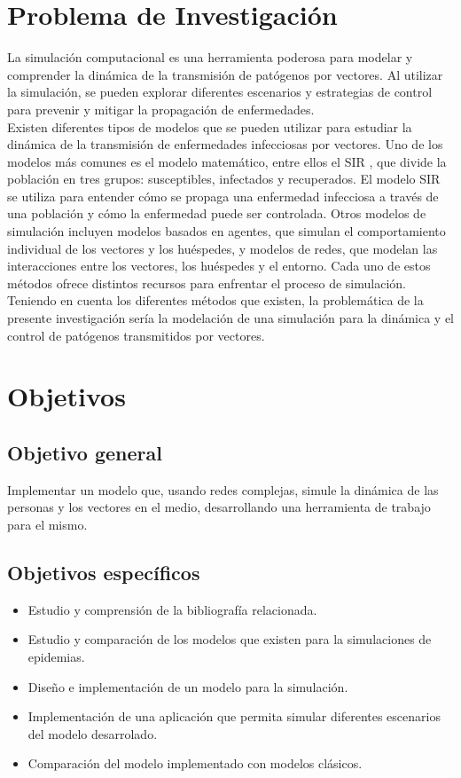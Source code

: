 \section{Problema de Investigación}
La simulación computacional es una herramienta poderosa para modelar y comprender
la dinámica de la transmisión de patógenos por vectores. Al utilizar la simulación,
se pueden explorar diferentes escenarios y estrategias de control para prevenir y mitigar 
la propagación de enfermedades.\\
Existen diferentes tipos de modelos que se pueden utilizar para estudiar 
la dinámica de la transmisión de enfermedades infecciosas por vectores. Uno
de los modelos más comunes es el modelo matemático, entre ellos el SIR 
\autocite{Kermack1927}, que divide la población en tres grupos:
susceptibles, infectados y recuperados. El modelo SIR se utiliza para entender cómo
se propaga una enfermedad infecciosa a través de una población y cómo la enfermedad 
puede ser controlada. Otros modelos de simulación incluyen modelos basados en
agentes, que simulan el comportamiento individual de los vectores y los huéspedes, y
modelos de redes, que modelan las interacciones entre los vectores, los huéspedes y
el entorno. Cada uno de estos métodos ofrece distintos recursos para enfrentar el proceso de simulación.\\
Teniendo en cuenta los diferentes métodos que existen, la problemática de la presente
investigación sería la modelación de una simulación para la dinámica y el control de patógenos 
transmitidos por vectores. \\

\section{Objetivos}
\subsection{Objetivo general}
Implementar un modelo que, usando redes complejas, simule la dinámica de las personas y los vectores en el medio, 
desarrollando una herramienta de trabajo para el mismo.

\subsection{Objetivos específicos}
\begin{itemize}
    \item Estudio y comprensión de la bibliografía relacionada.
    \item Estudio y comparación de los modelos que existen para la simulaciones de epidemias.
    \item Diseño e implementación de un modelo para la simulación.
    \item Implementación de una aplicación que permita simular diferentes escenarios del modelo desarrolado.
    \item Comparación del modelo implementado con modelos clásicos.
\end{itemize}


